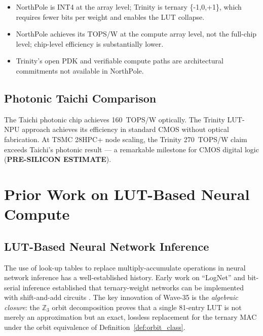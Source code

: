 \begin{itemize}
  \item NorthPole is INT4 at the array level; Trinity is ternary \{-1,0,+1\},
    which requires fewer bits per weight and enables the LUT collapse.
  \item NorthPole achieves its TOPS/W at the compute array level, not the
    full-chip level; chip-level efficiency is substantially lower.
  \item Trinity's open PDK and verifiable compute paths are architectural
    commitments not available in NorthPole.
\end{itemize}

\subsection{Photonic Taichi Comparison}

The Taichi photonic chip \cite{photonic_taichi_2024} achieves 160~TOPS/W
optically.  The Trinity LUT-NPU approach achieves its efficiency in standard
CMOS without optical fabrication.  At TSMC 28HPC+ node scaling, the Trinity
270~TOPS/W claim exceeds Taichi's photonic result — a remarkable milestone
for CMOS digital logic (\textbf{PRE-SILICON ESTIMATE}).

\section{Prior Work on LUT-Based Neural Compute}
\label{sec:prior_work_lut}

\subsection{LUT-Based Neural Network Inference}

The use of look-up tables to replace multiply-accumulate operations in neural
network inference has a well-established history.  Early work on
``LogNet'' and bit-serial inference established that ternary-weight networks
can be implemented with shift-and-add circuits \cite{bitnet_b158_2024}.
The key innovation of Wave-35 is the \emph{algebraic closure}: the
$\mathbb{Z}_3$ orbit decomposition proves that a single 81-entry LUT
is not merely an approximation but an exact, lossless replacement for
the ternary MAC under the orbit equivalence of
Definition~\ref{def:orbit_class}.


